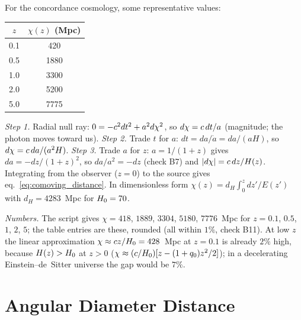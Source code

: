 For the concordance cosmology, some representative values:
\begin{center}
\begin{tabular}{cc}
\toprule
$z$ & $\chi(z)$ (Mpc) \\
\midrule
0.1 & 420 \\
0.5 & 1880 \\
1.0 & 3300 \\
2.0 & 5200 \\
5.0 & 7775 \\
\bottomrule
\end{tabular}
\end{center}


\begin{derivation}[From $ds^2 = 0$ to $\chi(z) = \int \speedoflight\,dz/H$]
\textit{Step 1.}  Radial null ray: $0 = -c^2dt^2 + a^2d\chi^2$, so
$d\chi = c\,dt/a$ (magnitude; the photon moves toward us).
\textit{Step 2.}  Trade $t$ for $a$: $dt = da/\dot a = da/(aH)$, so
$d\chi = c\,da/(a^2H)$.
\textit{Step 3.}  Trade $a$ for $z$: $a = 1/(1+z)$ gives $da = -dz/(1+z)^2$, so
$da/a^2 = -dz$ (check B7) and $|d\chi| = c\,dz/H(z)$.  Integrating
from the observer ($z = 0$) to the source gives
eq.~\eqref{eq:comoving_distance}.  In dimensionless form
$\chi(z) = d_H\int_0^z dz'/E(z')$ with $d_H = 4283$~Mpc for
$H_0 = 70$.

\textit{Numbers.}  The script gives $\chi = 418$, $1889$, $3304$, $5180$,
$7776$~Mpc for $z = 0.1$, $0.5$, $1$, $2$, $5$; the table entries are these,
rounded (all within $1\%$, check B11).  At low $z$ the linear approximation
$\chi \approx
c z/H_0 = 428$~Mpc at $z = 0.1$ is already $2\%$ high, because
$H(z) > H_0$ at $z > 0$ ($\chi \approx (c/H_0)[z -
(1+q_0)z^2/2]$); in a decelerating Einstein--de~Sitter universe the gap would be
$7\%$.
\end{derivation}

\section{Angular Diameter Distance}
\label{sec:angular_diameter_distance}

